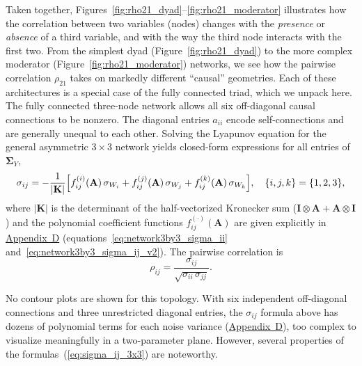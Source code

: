 \documentclass[12pt]{article}
\begin{document}
Taken together, Figures~\ref{fig:rho21_dyad}--\ref{fig:rho21_moderator} illustrates how the correlation between two variables (nodes) changes with the \emph{presence} or \emph{absence} of a third variable, and with the way the third node interacts with the first two. From the simplest dyad
(Figure~\ref{fig:rho21_dyad}) to the more complex moderator (Figure~\ref{fig:rho21_moderator}) networks, we see how the pairwise
correlation $\rho_{21}$ takes on markedly different ``causal'' geometries. Each of these architectures is a special case of the fully connected triad, which we unpack here.
The fully connected three-node network allows all six
off-diagonal causal connections to be nonzero. The diagonal entries $a_{ii}$ encode self-connections and
are generally unequal to each other. Solving the Lyapunov equation for the general asymmetric
$3\times3$ network yields closed-form expressions for all
entries of $\mathbf{\Sigma}_Y$,
\begin{equation}
\sigma_{ij} = -\frac{1}{|\mathbf{K}|}
\Bigl[
  f_{ij}^{(i)}(\mathbf{A})\,\sigma_{W_i}
  + f_{ij}^{(j)}(\mathbf{A})\,\sigma_{W_j}
  + f_{ij}^{(k)}(\mathbf{A})\,\sigma_{W_k}
\Bigr],
\quad \{i,j,k\}=\{1,2,3\},
\label{eq:sigma_ij_3x3}
\end{equation}
where $|\mathbf{K}|$ is the determinant of the half-vectorized Kronecker sum
($\mathbf{I}\otimes\mathbf{A}
+\mathbf{A}\otimes\mathbf{I}$) and the polynomial coefficient
functions $f_{ij}^{(\cdot)}(\mathbf{A})$ are given explicitly
in \hyperref[app:appD]{Appendix~D}
(equations~\ref{eq:network3by3_sigma_ii}
and~\ref{eq:network3by3_sigma_ij_v2}).
The pairwise correlation is
\begin{equation}
\rho_{ij} = \frac{\sigma_{ij}}
                 {\sqrt{\sigma_{ii}\,\sigma_{jj}}}.
\label{eq:rho_ij_3x3}
\end{equation}

No contour plots are shown for this topology. With six
independent off-diagonal connections and three unrestricted
diagonal entries, the $\sigma_{ij}$ formula above has
dozens of polynomial terms for each noise variance (\hyperref[app:appD]{Appendix~D}), too
complex to visualize meaningfully in a two-parameter plane. However, several properties of the
formulas~(\ref{eq:sigma_ij_3x3}) are noteworthy.
\end{document}
